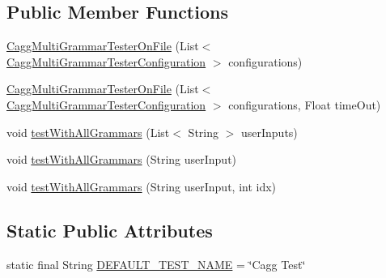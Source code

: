\subsection*{Public Member Functions}
\begin{DoxyCompactItemize}
\item 
\hyperlink{classit_1_1emarolab_1_1cagg_1_1interfaces_1_1CaggMultiGrammarTesterOnFile_a1cf3bcda5353cdb15247ead98fd2cf34}{Cagg\-Multi\-Grammar\-Tester\-On\-File} (List$<$ \hyperlink{classit_1_1emarolab_1_1cagg_1_1interfaces_1_1CaggMultiGrammarTesterConfiguration}{Cagg\-Multi\-Grammar\-Tester\-Configuration} $>$ configurations)
\item 
\hyperlink{classit_1_1emarolab_1_1cagg_1_1interfaces_1_1CaggMultiGrammarTesterOnFile_a3f7c20b95d10a6685b787e8d305615fa}{Cagg\-Multi\-Grammar\-Tester\-On\-File} (List$<$ \hyperlink{classit_1_1emarolab_1_1cagg_1_1interfaces_1_1CaggMultiGrammarTesterConfiguration}{Cagg\-Multi\-Grammar\-Tester\-Configuration} $>$ configurations, Float time\-Out)
\item 
void \hyperlink{classit_1_1emarolab_1_1cagg_1_1interfaces_1_1CaggMultiGrammarTesterOnFile_afb41394c0a51e26c7fbe382edd093ad1}{test\-With\-All\-Grammars} (List$<$ String $>$ user\-Inputs)
\item 
void \hyperlink{classit_1_1emarolab_1_1cagg_1_1interfaces_1_1CaggMultiGrammarTesterOnFile_a3d5118f171f23f8bf5197bb7bcb2f600}{test\-With\-All\-Grammars} (String user\-Input)
\item 
void \hyperlink{classit_1_1emarolab_1_1cagg_1_1interfaces_1_1CaggMultiGrammarTesterOnFile_a17c47cfbce4995f6192341a54bf4d6cd}{test\-With\-All\-Grammars} (String user\-Input, int idx)
\end{DoxyCompactItemize}
\subsection*{Static Public Attributes}
\begin{DoxyCompactItemize}
\item 
static final String \hyperlink{classit_1_1emarolab_1_1cagg_1_1interfaces_1_1CaggMultiGrammarTesterOnFile_abdbd06b0fcc54d30e426181e20ed181b}{D\-E\-F\-A\-U\-L\-T\-\_\-\-T\-E\-S\-T\-\_\-\-N\-A\-M\-E} = \char`\"{}Cagg Test\char`\"{}
\end{DoxyCompactItemize}
